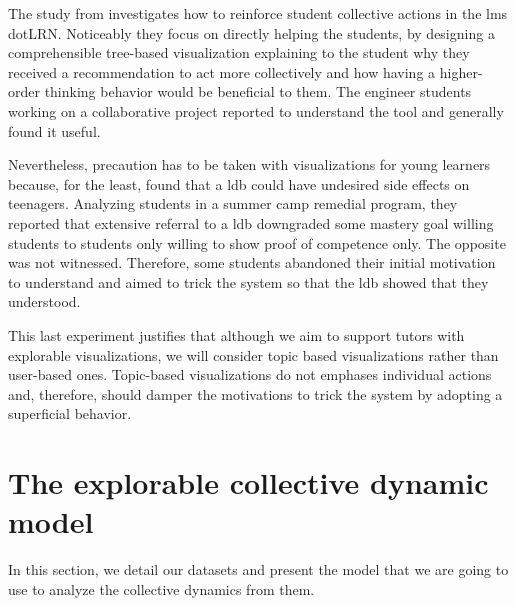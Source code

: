 \documentclass[a4paper,twoside]{article}
\begin{document}
The study from \cite{Anaya2016} investigates how to reinforce student collective actions in the \gls{lms} dotLRN.  Noticeably they focus on directly helping the students, by designing a comprehensible tree-based visualization explaining to the student why they received a recommendation to act more collectively and how having a higher-order thinking behavior would be beneficial to them.
The engineer students working on a collaborative project reported to understand the tool and generally found it useful.

Nevertheless, precaution has to be taken with visualizations for young learners because, for the least, \cite{Lonn2015} found that a \gls{ldb} could have undesired side effects on teenagers.  Analyzing students in a summer camp remedial program, they reported that extensive referral to a \gls{ldb} downgraded some mastery goal willing students to students only willing to show proof of competence only.  The opposite was not witnessed.  Therefore, some students abandoned their initial motivation to understand and aimed to trick the system so that the \gls{ldb} showed that they understood.

This last experiment justifies that although we aim to support tutors with explorable visualizations, we will consider topic based visualizations rather than user-based ones.  Topic-based visualizations do not emphases individual actions and, therefore, should damper the motivations to trick the system by adopting a superficial behavior.


\section{The explorable collective dynamic model}
\label{section:4}
In this section, we detail our datasets and present the model that we are going to use to analyze the collective dynamics from them.
\end{document}
